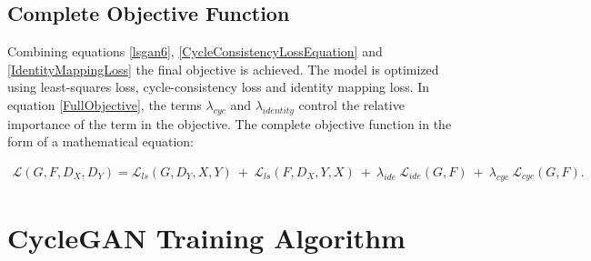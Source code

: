 \subsection{Complete Objective Function}

Combining equations \ref{lsgan6}, \ref{CycleConsistencyLossEquation} and \ref{IdentityMappingLoss} the final objective is achieved. The model is optimized using least-squares loss, cycle-consistency loss and identity mapping loss. In equation \ref{FullObjective}, the terms $\lambda_{cyc}$ and $\lambda_{identity}$ control the relative importance of the term in the objective. The complete objective function in the form of a mathematical equation:

\begin{equation}\label{FullObjective}
\begin{aligned}
    \mathcal{L}(G, F, D_X, D_Y) =  \mathcal{L}_{ls}(G, D_Y, X, Y)\ +\ \mathcal{L}_{ls}(F, D_X, Y, X)\ +\ 
    \lambda_{ide}\ \mathcal{L}_{ide}(G, F)\ +\ \lambda_{cyc}\ \mathcal{L}_{cyc}(G, F).
\end{aligned}
\end{equation}
    

\section{\ac{CycleGAN} Training Algorithm}\label{CycleGANAlgorithm}



